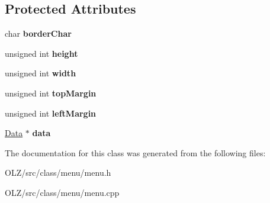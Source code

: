 \subsection*{Protected Attributes}
\begin{DoxyCompactItemize}
\item 
\hypertarget{class_menu_a912c40f15f93092412c8d6204c0f8788}{}char {\bfseries border\+Char}\label{class_menu_a912c40f15f93092412c8d6204c0f8788}

\item 
\hypertarget{class_menu_a84dd6e7e6b263601781683951687bf42}{}unsigned int {\bfseries height}\label{class_menu_a84dd6e7e6b263601781683951687bf42}

\item 
\hypertarget{class_menu_a934c7679ed1575cc9924919b9b3eccb1}{}unsigned int {\bfseries width}\label{class_menu_a934c7679ed1575cc9924919b9b3eccb1}

\item 
\hypertarget{class_menu_a572349c0905151704d7cea8e82097e5f}{}unsigned int {\bfseries top\+Margin}\label{class_menu_a572349c0905151704d7cea8e82097e5f}

\item 
\hypertarget{class_menu_acabd9ee2058f2b5cd3bf64903f53d4de}{}unsigned int {\bfseries left\+Margin}\label{class_menu_acabd9ee2058f2b5cd3bf64903f53d4de}

\item 
\hypertarget{class_menu_a3914261df4f4fbadd9c0a854a5f42b0b}{}\hyperlink{class_data}{Data} $\ast$ {\bfseries data}\label{class_menu_a3914261df4f4fbadd9c0a854a5f42b0b}

\end{DoxyCompactItemize}


The documentation for this class was generated from the following files\+:\begin{DoxyCompactItemize}
\item 
O\+L\+Z/src/class/menu/menu.\+h\item 
O\+L\+Z/src/class/menu/menu.\+cpp\end{DoxyCompactItemize}
